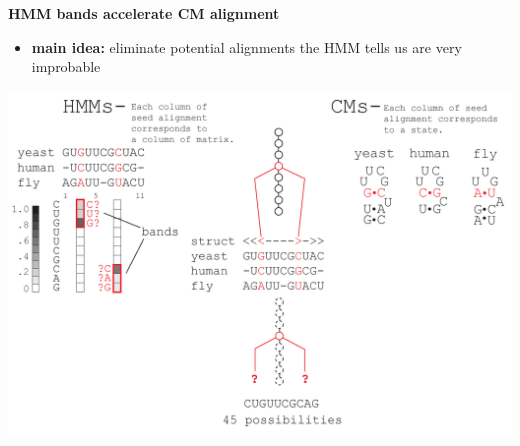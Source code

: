 \documentclass[landscape]{slides}
\begin{document}
\begin{slide}
\begin{center}

\textbf{HMM bands accelerate CM alignment}
\end{center}
\medskip
\small
\begin{itemize}
\item
\textbf{main idea:} eliminate potential alignments the HMM tells us are very improbable
\end{itemize}
\begin{center}
\includegraphics[width=8in]{figs/post_hmm_to_cm_map2_layer15}
\end{center}
\vfill
\end{slide}
\end{document}
